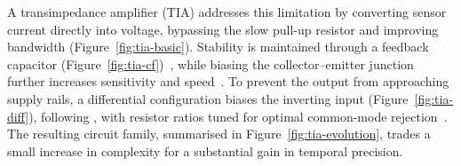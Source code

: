 A transimpedance amplifier (TIA) addresses this limitation by converting sensor current directly into voltage, bypassing the slow pull-up resistor and improving bandwidth (Figure~\ref{fig:tia-basic}). Stability is maintained through a feedback capacitor (Figure~\ref{fig:tia-cf})~\cite[p.\ 233]{horowitz_art_2015}, while biasing the collector--emitter junction further increases sensitivity and speed~\cite{falco_understanding_2023, pardue_near_2013}. To prevent the output from approaching supply rails, a differential configuration biases the inverting input (Figure~\ref{fig:tia-diff}), following \textcite{mcpherson_portable_2013}, with resistor ratios tuned for optimal common-mode rejection~\cite[p.\ 227]{horowitz_art_2015}. The resulting circuit family, summarised in Figure~\ref{fig:tia-evolution}, trades a small increase in complexity for a substantial gain in temporal precision.

